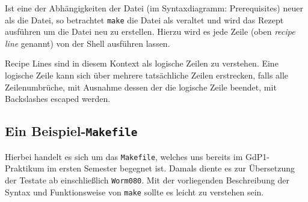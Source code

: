 	Ist eine der Abhängigkeiten der Datei (im Syntaxdiagramm: Prerequisites)
	neuer als die Datei, so betrachtet \texttt{make} die Datei als veraltet
	und wird das Rezept ausführen um die Datei neu zu erstellen. Hierzu wird
	es jede Zeile (oben \textit{recipe line} genannt) von der Shell
	ausführen lassen.

	Recipe Lines sind in diesem Kontext als logische Zeilen zu verstehen.
	Eine logische Zeile kann sich über mehrere tatsächliche Zeilen
	erstrecken, falls alle Zeilenumbrüche, mit Ausnahme dessen der die
	logische Zeile beendet, mit Backslashes escaped werden.

\clearpage \subsection{Ein Beispiel-\texttt{Makefile}}
\label{subsubsection:examplemakefile}

Hierbei handelt es sich um das \texttt{Makefile}, welches uns bereits im
GdP1-Praktikum im ersten Semester begegnet ist. Damals diente es zur Übersetzung
der Testate ab einschließlich \texttt{Worm080}. Mit der vorliegenden
Beschreibung der Syntax und Funktionsweise von \texttt{make} sollte es leicht zu
verstehen sein.

{
\footnotesize
\inputminted[linenos=true,stepnumber=5]{make}{../code/Worm080_Makefile}
}
